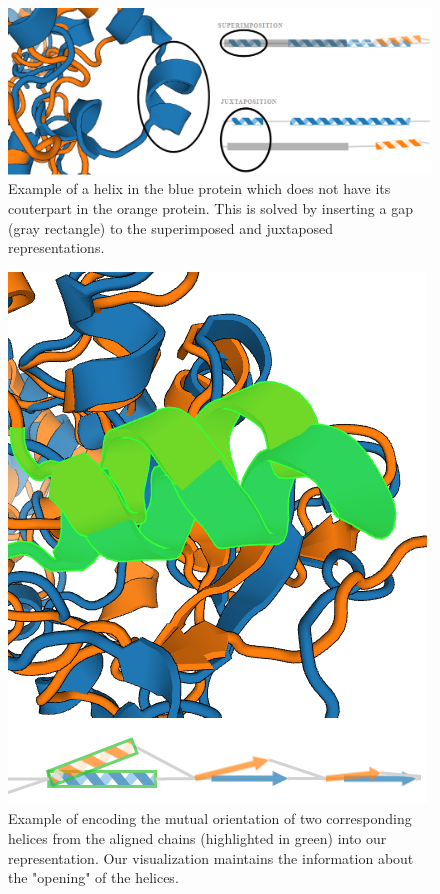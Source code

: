 \documentclass[twocolumn]{bmcart}%
\begin{document}
\begin{figure}[ht]
  \centering
  \includegraphics[width=0.9\linewidth]{pics/gap2.png}
  \caption{Example of a helix in the blue protein which does not have its couterpart in the orange protein. This is solved by inserting a gap (gray rectangle) to the superimposed and juxtaposed representations.}
  \label{fig:gap}
\end{figure}

\begin{figure}[th]
  \centering
  \includegraphics[width=0.9\linewidth]{pics/orientation.png}
  \caption{Example of encoding the mutual orientation of two corresponding helices from the aligned chains (highlighted in green) into our representation. Our visualization maintains the information about the "opening" of the helices.}
  \label{fig:orientation}
\end{figure}
\end{document}
